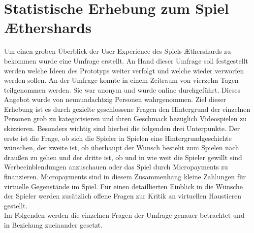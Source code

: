 




\section{Statistische Erhebung zum Spiel Æthershards}
Um einen groben Überblick der User Experience des Spiels Æthershards zu bekommen wurde eine Umfrage erstellt. An Hand dieser Umfrage soll festgestellt werden welche Ideen des Prototyps weiter verfolgt und welche wieder verworfen werden sollen. An der Umfrage konnte in einem Zeitraum von vierzehn Tagen teilgenommen werden. Sie war anonym und wurde online durchgeführt. Dieses Angebot wurde von neunundachtzig Personen wahrgenommen. Ziel dieser Erhebung ist es durch gezielte geschlossene Fragen den Hintergrund der einzelnen Personen grob zu kategorisieren und ihren Geschmack bezüglich Videospielen zu skizzieren. Besonders wichtig sind hierbei die folgenden drei Unterpunkte. Der erste ist die Frage, ob sich die Spieler in Spielen eine Hintergrundgeschichte wünschen, der zweite ist, ob überhaupt der Wunsch besteht zum Spielen nach draußen zu gehen und der dritte ist, ob und in wie weit die Spieler gewillt sind Werbeeinblendungen anzuschauen oder das Spiel durch Micropayments zu finanzieren. Micropayments sind in diesem Zusammenhang kleine Zahlungen für virtuelle Gegenstände im Spiel. Für einen detaillierten Einblick in die Wünsche der Spieler werden zusätzlich offene Fragen zur Kritik an virtuellen Haustieren gestellt. \\
Im Folgenden werden die einzelnen Fragen der Umfrage genauer betrachtet und in Beziehung zueinander gesetzt.
